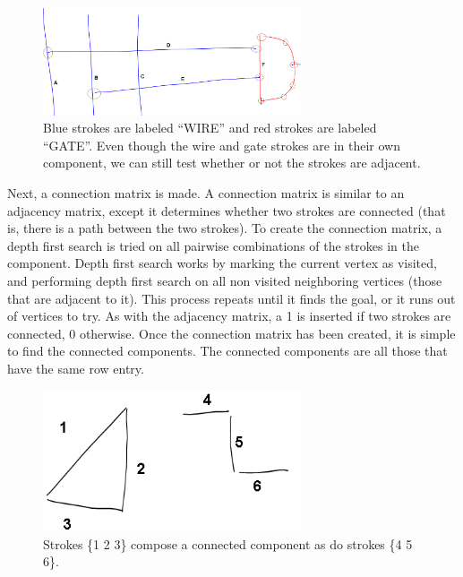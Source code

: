 \documentclass[10pt]{acmsiggraph}               %
\begin{document}
\begin{figure}[h]
\centering
\includegraphics[width=3.0in]{adjacencies.png}%
\caption{Blue strokes are labeled ``WIRE'' and red strokes are labeled ``GATE''. 
Even though the wire and gate strokes are in their own component, we can still test whether or not the strokes are adjacent.}
\label{fig:adjacencies}
\end{figure}


Next, a connection matrix is made.
A connection matrix is similar to an adjacency matrix, except it determines whether two strokes are connected (that is, there is a path between the two strokes).
To create the connection matrix, a depth first search is tried on all pairwise combinations of the strokes in the component.
Depth first search works by marking the current vertex as visited, and performing depth first search on all non visited neighboring vertices (those that are adjacent to it).
This process repeats until it finds the goal, or it runs out of vertices to try.
As with the adjacency matrix, a 1 is inserted if two strokes are connected, 0 otherwise.
Once the connection matrix has been created, it is simple to find the connected components.
The connected components are all those that have the same row entry.


\begin{figure}[h]
\centering
\includegraphics[width=3.0in]{connections.png}%
\caption{Strokes \{1 2 3\} compose a connected component as do strokes \{4 5 6\}.}
\label{fig:connections}
\end{figure}
\end{document}

